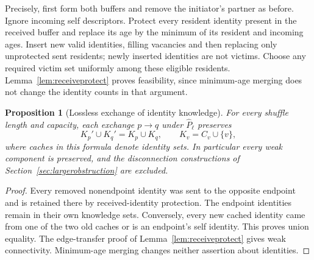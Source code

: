 \documentclass[11pt]{article}
\newtheorem{proposition}[theorem]{Proposition}
\begin{document}
Precisely, first form both buffers and remove the initiator's
partner as before. Ignore incoming self descriptors. Protect
every resident identity present in the received buffer and
replace its age by the minimum of its resident and incoming ages.
Insert new valid identities, filling vacancies and then replacing
only unprotected sent residents; newly inserted identities are
not victims. Choose any required victim set uniformly among
these eligible residents. Lemma~\ref{lem:receiveprotect} proves
feasibility, since minimum-age merging does not change the
identity counts in that argument.

\begin{proposition}[Lossless exchange of identity knowledge]
\label{prop:thesisunion}
For every shuffle length and capacity, each exchange $p\to q$
under $\widehat P_\ell$ preserves
\[
 K_p'\cup K_q'=K_p\cup K_q,\qquad K_v=C_v\cup\{v\},
\]
where caches in this formula denote identity sets.
In particular every weak component is preserved, and the
disconnection constructions of Section~\ref{sec:largerobstruction}
are excluded.
\end{proposition}
\begin{proof}
Every removed nonendpoint identity was sent to the opposite
endpoint and is retained there by received-identity protection.
The endpoint identities remain in their own knowledge sets.
Conversely, every new cached identity came from one of the
two old caches or is an endpoint's self identity.
This proves union equality. The edge-transfer proof of
Lemma~\ref{lem:receiveprotect} gives weak connectivity.
Minimum-age merging changes neither assertion about identities.
\end{proof}
\end{document}
